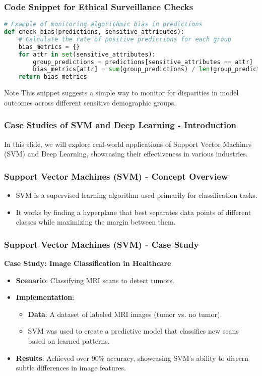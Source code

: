 \documentclass[aspectratio=169]{beamer}
\begin{document}
\begin{frame}[fragile]
    \frametitle{Code Snippet for Ethical Surveillance Checks}
    \begin{lstlisting}[language=Python]
# Example of monitoring algorithmic bias in predictions
def check_bias(predictions, sensitive_attributes):
    # Calculate the rate of positive predictions for each group
    bias_metrics = {}
    for attr in set(sensitive_attributes):
        group_predictions = predictions[sensitive_attributes == attr]
        bias_metrics[attr] = sum(group_predictions) / len(group_predictions)
    return bias_metrics
    \end{lstlisting}
    \begin{block}{Note}
        This snippet suggests a simple way to monitor for disparities in model outcomes across different sensitive demographic groups.
    \end{block}
\end{frame}

\begin{frame}[fragile]
    \frametitle{Case Studies of SVM and Deep Learning - Introduction}
    In this slide, we will explore real-world applications of Support Vector Machines (SVM) and Deep Learning, showcasing their effectiveness in various industries.
\end{frame}

\begin{frame}[fragile]
    \frametitle{Support Vector Machines (SVM) - Concept Overview}
    \begin{itemize}
        \item SVM is a supervised learning algorithm used primarily for classification tasks.
        \item It works by finding a hyperplane that best separates data points of different classes while maximizing the margin between them.
    \end{itemize}
\end{frame}

\begin{frame}[fragile]
    \frametitle{Support Vector Machines (SVM) - Case Study}
    \textbf{Case Study: Image Classification in Healthcare} 
    \begin{itemize}
        \item \textbf{Scenario}: Classifying MRI scans to detect tumors.
        \item \textbf{Implementation}:
        \begin{itemize}
            \item \textbf{Data}: A dataset of labeled MRI images (tumor vs. no tumor).
            \item SVM was used to create a predictive model that classifies new scans based on learned patterns.
        \end{itemize}
        \item \textbf{Results}: Achieved over 90\% accuracy, showcasing SVM’s ability to discern subtle differences in image features.
    \end{itemize}
\end{frame}
\end{document}
